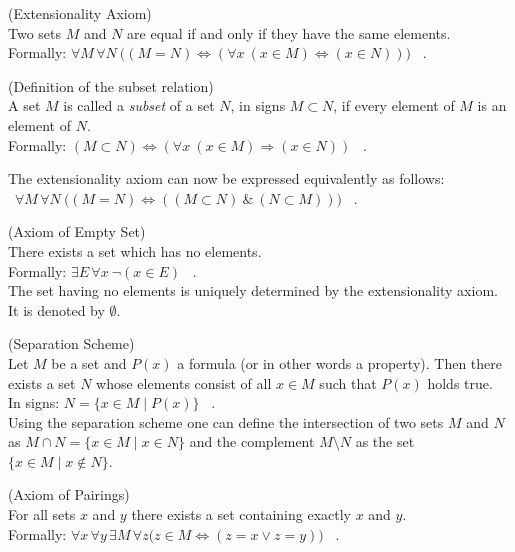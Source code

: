 \begin{axiomlist}[S]
\item ({\sffamily Extensionality Axiom}) \\
  Two sets $M$ and $N$ are equal if and only if they have the same elements.\\
  Formally: $\forall M \, \forall N \: \big( (M = N) \Leftrightarrow (\forall x  \: (x\in M) \Leftrightarrow (x\in N))\big) $ \ .
\item[] (Definition of the subset relation) \\
  A set $M$ is called a \emph{subset} of a set $N$, in signs $M\subset N$, if every element of $M$ is an element of $N$.  \\
  Formally: $ (M\subset N) \Leftrightarrow ( \forall x \:  (x\in M) \Rightarrow (x\in N))$ \ . 
\item[]
  The extensionality axiom can now be expressed equivalently as follows: \\
  \mbox{ }\hspace{17mm}$\forall M \, \forall N \: \big( (M = N) \Leftrightarrow ( ( M \subset N) \: \& \: (N \subset M)) \big)$ \ . 
\item ({\sffamily Axiom of Empty Set})\\
  There exists a set which has no elements.\\
  Formally: $\exists E \, \forall x \: \neg (x \in E)$  \ .
  \\[1mm]
  The set having no elements is uniquely determined by the extensionality axiom. It is 
  denoted by $\emptyset$.  
\item ({\sffamily Separation Scheme})\\
  Let $M$ be  a set and $P(x)$ a formula (or in other words a property). Then there exists 
  a set $N$ whose elements consist of all $x\in M$ such that $P(x)$ holds true. \\
  In signs: $ N = \{ x \in M \mid P(x) \} $ \ . 
  \\[1mm]
  Using the separation scheme one can define the intersection of two sets $M$ and $N$ as 
  $M \cap N = \{ x\in M\mid x\in N\}$ and the complement $M \setminus N$ as the set 
  $\{ x\in M \mid x \notin N\}$. 
\item ({\sffamily Axiom of Pairings})\\
  For all sets $x$ and $y$ there exists a set containing exactly $x$ and $y$. \\
  Formally: $\forall x \, \forall y \, \exists M \, \forall z \big( z \in M \Leftrightarrow (z = x \vee z = y )\big)$  \ .
  \\[1mm]

\end{axiomlist}
